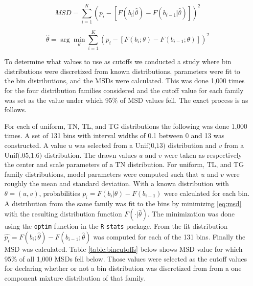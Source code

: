 \documentclass[11pt,notitlepage]{isuthesis}
\begin{document}
\begin{equation}
  MSD = \sum_{i=1}^K (p_i - [F(b_i| \hat{\theta}) - F(b_{i-1}| \hat{\theta})])^2
  \label{eq:msd}
\end{equation}


\begin{equation}
\hat{\theta} = \arg\min_{\theta}\sum_{i=1}^K (p_i - 
[F(b_i; \theta) - F(b_{i-1}; \theta)])^2
\label{eq:discfit}
\end{equation}




To determine what values to use as cutoffs we conducted a study where 
bin distributions were discretized from known distributions, 
parameters were fit to the bin distributions, and the MSDs were calculated. This 
was done 1,000 times for the four distribution families considered and the 
cutoff 
value for each family was set as the value under which 95\% of MSD values fell.
The exact process is as follows.

For each of uniform, TN, TL, and 
TG distributions the following was
done 1,000 times. A set of 131 bins with interval widths of 
0.1 between 0 and 13 was constructed. 
A value $u$ was selected from a $\mbox{Unif(0,13)}$ distribution and $v$ from 
a $\mbox{Unif(.05,1.6)}$ distribution. The drawn values
$u$ and $v$ were taken as respectively 
the center and scale parameters of a TN distribution. 
For uniform, TL, and TG family
distributions, model parameters were computed such that $u$ and $v$ 
were roughly the mean and standard deviation.
With a known distribution with $\theta = (u,v)$, 
probabilities $p_i =F(b_i| \theta) - F(b_{i-1})$ were
calculated for each bin. A distribution from the same
family was fit to the bins by minimizing \eqref{eq:msd} with the resulting
distribution function $F(\cdot| \hat{\theta})$. 
The minimization was done using 
the \texttt{optim} function in the \texttt{R} \texttt{stats} package.
From the fit distribution
$\hat{p_i} = F(b_i; \hat{\theta}) - F(b_{i-1}; \hat{\theta})$ was computed for 
each of the 131 bins. Finally the MSD was calculated. 
Table \ref{table:bincutoffs}
below shows MSD value for which 95\% of all 1,000 MSDs fell below. Those values 
were selected as the 
cutoff values for declaring whether or not a bin distribution was discretized
from from a one component mixture distribution of that family.
\end{document}
